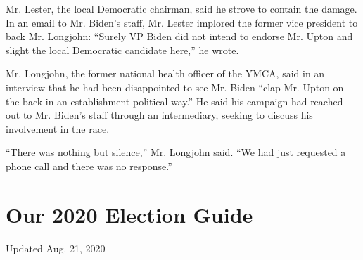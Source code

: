Mr. Lester, the local Democratic chairman, said he strove to contain the
damage. In an email to Mr. Biden's staff, Mr. Lester implored the former
vice president to back Mr. Longjohn: ``Surely VP Biden did not intend to
endorse Mr. Upton and slight the local Democratic candidate here,'' he
wrote.

Mr. Longjohn, the former national health officer of the YMCA, said in an
interview that he had been disappointed to see Mr. Biden ``clap Mr.
Upton on the back in an establishment political way.'' He said his
campaign had reached out to Mr. Biden's staff through an intermediary,
seeking to discuss his involvement in the race.

``There was nothing but silence,'' Mr. Longjohn said. ``We had just
requested a phone call and there was no response.''

\hypertarget{our-2020-election-guide}{%
\section{Our 2020 Election Guide}\label{our-2020-election-guide}}

Updated Aug. 21, 2020

